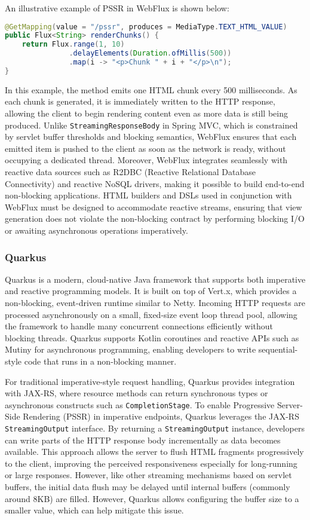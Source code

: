 An illustrative example of PSSR in WebFlux is shown below:

\begin{lstlisting}[language=Java]
@GetMapping(value = "/pssr", produces = MediaType.TEXT_HTML_VALUE)
public Flux<String> renderChunks() {
    return Flux.range(1, 10)
               .delayElements(Duration.ofMillis(500))
               .map(i -> "<p>Chunk " + i + "</p>\n");
}
\end{lstlisting}

In this example, the method emits one HTML chunk every 500 milliseconds. As
each chunk is generated, it is immediately written to the HTTP response,
allowing the client to begin rendering content even as more data is still being
produced. Unlike \texttt{StreamingResponseBody} in Spring MVC, which is
constrained by servlet buffer thresholds and blocking semantics, WebFlux
ensures that each emitted item is pushed to the client as soon as the network
is ready, without occupying a dedicated thread. Moreover, WebFlux integrates
seamlessly with reactive data sources such as R2DBC (Reactive Relational
Database Connectivity) and reactive NoSQL drivers, making it possible to build
end-to-end non-blocking applications. HTML builders and DSLs used in
conjunction with WebFlux must be designed to accommodate reactive streams,
ensuring that view generation does not violate the non-blocking contract by
performing blocking I/O or awaiting asynchronous operations imperatively.

\subsubsection{Quarkus}

Quarkus is a modern, cloud-native Java framework that supports both imperative
and reactive programming models. It is built on top of Vert.x,
which provides a non-blocking, event-driven runtime similar to Netty. Incoming
HTTP requests are processed asynchronously on a small, fixed-size event loop
thread pool, allowing the framework to handle many concurrent connections
efficiently without blocking threads. Quarkus supports Kotlin coroutines and
reactive APIs such as Mutiny for asynchronous programming, enabling developers
to write sequential-style code that runs in a non-blocking manner.

For traditional imperative-style request handling, Quarkus provides integration
with JAX-RS, where resource methods can return synchronous types or
asynchronous constructs such as \texttt{CompletionStage}. To enable Progressive
Server-Side Rendering (PSSR) in imperative endpoints, Quarkus leverages the
JAX-RS \texttt{StreamingOutput} interface. By returning a
\texttt{StreamingOutput} instance, developers can write parts of the HTTP
response body incrementally as data becomes available. This approach allows the
server to flush HTML fragments progressively to the client, improving the
perceived responsiveness especially for long-running or large responses.
However, like other streaming mechanisms based on servlet buffers, the initial
data flush may be delayed until internal buffers (commonly around 8KB) are
filled. However, Quarkus allows configuring the buffer size to a smaller value, which
can help mitigate this issue.

